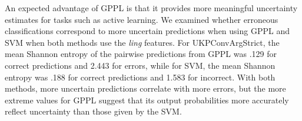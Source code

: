 % 


An expected advantage of GPPL is that it provides more meaningful uncertainty estimates for tasks such as active learning. 
We examined whether erroneous classifications correspond to more uncertain predictions
when using GPPL and SVM when both methods use the \emph{ling} features.
For UKPConvArgStrict, the mean Shannon entropy
of the pairwise predictions from GPPL 
was .129 for correct predictions and 2.443 for errors,
while for SVM, the mean Shannon entropy was  .188 for correct predictions and 
1.583 for incorrect.
With both methods, more uncertain predictions correlate with more errors,
but the more extreme values for GPPL suggest that its output probabilities more 
accurately reflect uncertainty than those given by the SVM.

